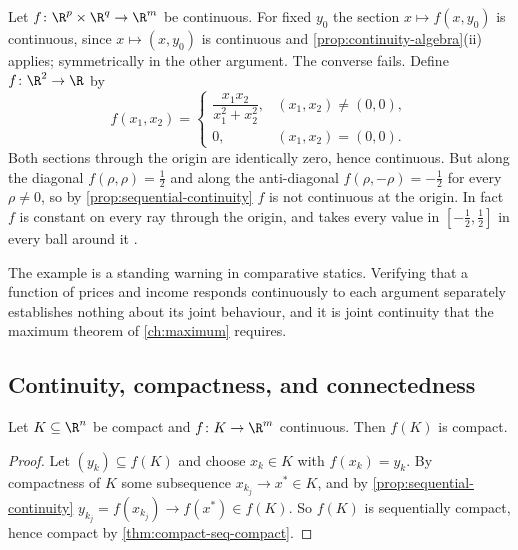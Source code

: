 \begin{eg}
	\label{eg:separate-vs-joint}
	Let $f\colon\R^p\times\R^q\to\R^m$ be continuous. For fixed $y_0$ the section
	$x\mapsto f(x,y_0)$ is continuous, since $x\mapsto(x,y_0)$ is continuous and
	\autoref{prop:continuity-algebra}(ii) applies; symmetrically in the other
	argument. The converse fails. Define $f\colon\R^2\to\R$ by
	\[
		f(x_1,x_2)=
		\begin{cases}
			\dfrac{x_1x_2}{x_1^2+x_2^2}, & (x_1,x_2)\neq(0,0), \\[1.2ex]
			0,                           & (x_1,x_2)=(0,0).
		\end{cases}
	\]
	Both sections through the origin are identically zero, hence continuous. But
	along the diagonal $f(\rho,\rho)=\tfrac12$ and along the anti-diagonal
	$f(\rho,-\rho)=-\tfrac12$ for every $\rho\neq0$, so by
	\autoref{prop:sequential-continuity} $f$ is not continuous at the origin. In
	fact $f$ is constant on every ray through the origin, and takes every value in
	$[-\tfrac12,\tfrac12]$ in every ball around it
	\autocite[slides 54--55]{fukuda2026analysis}.

	The example is a standing warning in comparative statics. Verifying that a
	function of prices and income responds continuously to each argument separately
	establishes nothing about its joint behaviour, and it is joint continuity that
	the maximum theorem of \autoref{ch:maximum} requires.
\end{eg}

\subsection{Continuity, compactness, and connectedness}

\begin{proposition}\label{prop:continuous-compact}
	Let $K\subseteq\R^n$ be compact and $f\colon K\to\R^m$ continuous. Then $f(K)$
	is compact.
\end{proposition}

\begin{proof}
	Let $(y_k)\subseteq f(K)$ and choose $x_k\in K$ with $f(x_k)=y_k$. By
	compactness of $K$ some subsequence $x_{k_j}\to x^\ast\in K$, and by
	\autoref{prop:sequential-continuity} $y_{k_j}=f(x_{k_j})\to f(x^\ast)\in f(K)$.
	So $f(K)$ is sequentially compact, hence compact by
	\autoref{thm:compact-seq-compact}.
\end{proof}


